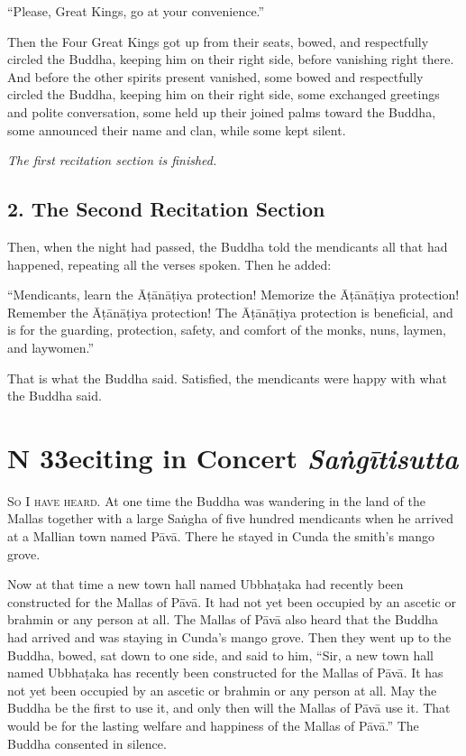 \documentclass[12pt,openany]{book}%
\newcommand*{\suttatitleacronym}[1]{\smaller[2]{#1}\vspace*{.3em}}
\newcommand*{\suttatitletranslation}[1]{\linebreak{#1}}
\newcommand*{\suttatitleroot}[1]{\linebreak\smaller[2]\itshape{#1}}
\newcommand*{\tocacronym}[1]{\hspace*{-3.3em}{#1}\quad}
\newcommand*{\toctranslation}[1]{#1}
\newcommand*{\tocroot}[1]{(\textit{#1})}
\newcommand*{\scendsection}[1]{\begin{center}\textit{#1}\end{center}}
\newcommand*{\scevam}[1]{\textsc{#1}}
\begin{document}
“Please, Great Kings, go at your convenience.” 

Then the Four Great Kings got up from their seats, bowed, and respectfully circled the Buddha, keeping him on their right side, before vanishing right there. And before the other spirits present vanished, some bowed and respectfully circled the Buddha, keeping him on their right side, some exchanged greetings and polite conversation, some held up their joined palms toward the Buddha, some announced their name and clan, while some kept silent. 

\scendsection{The first recitation section is finished. }

\section*{2. The Second Recitation Section }

Then, when the night had passed, the Buddha told the mendicants all that had happened, repeating all the verses spoken. Then he added: 

“Mendicants, learn the \textsanskrit{Āṭānāṭiya} protection! Memorize the \textsanskrit{Āṭānāṭiya} protection! Remember the \textsanskrit{Āṭānāṭiya} protection! The \textsanskrit{Āṭānāṭiya} protection is beneficial, and is for the guarding, protection, safety, and comfort of the monks, nuns, laymen, and laywomen.” 

That is what the Buddha said. Satisfied, the mendicants were happy with what the Buddha said. 

%
\chapter*{{\suttatitleacronym DN 33}{\suttatitletranslation Reciting in Concert }{\suttatitleroot Saṅgītisutta}}
\addcontentsline{toc}{chapter}{\tocacronym{DN 33} \toctranslation{Reciting in Concert } \tocroot{Saṅgītisutta}}

\scevam{So I have heard. }At one time the Buddha was wandering in the land of the Mallas together with a large \textsanskrit{Saṅgha} of five hundred mendicants when he arrived at a Mallian town named \textsanskrit{Pāvā}. There he stayed in Cunda the smith’s mango grove. 

Now at that time a new town hall named \textsanskrit{Ubbhaṭaka} had recently been constructed for the Mallas of \textsanskrit{Pāvā}. It had not yet been occupied by an ascetic or brahmin or any person at all. The Mallas of \textsanskrit{Pāvā} also heard that the Buddha had arrived and was staying in Cunda’s mango grove. Then they went up to the Buddha, bowed, sat down to one side, and said to him, “Sir, a new town hall named \textsanskrit{Ubbhaṭaka} has recently been constructed for the Mallas of \textsanskrit{Pāvā}. It has not yet been occupied by an ascetic or brahmin or any person at all. May the Buddha be the first to use it, and only then will the Mallas of \textsanskrit{Pāvā} use it. That would be for the lasting welfare and happiness of the Mallas of \textsanskrit{Pāvā}.” The Buddha consented in silence. 
\end{document}
